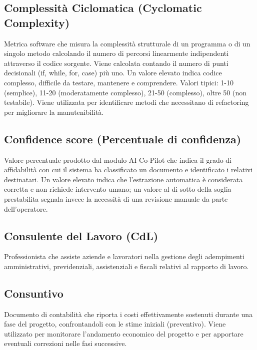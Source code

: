 \documentclass[a4paper,11pt]{article}
\begin{document}
\subsection{Complessità Ciclomatica (Cyclomatic Complexity)}
Metrica software che misura la complessità strutturale di un programma o di un singolo metodo calcolando il numero di percorsi linearmente indipendenti attraverso il codice sorgente. Viene calcolata contando il numero di punti decisionali (if, while, for, case) più uno. Un valore elevato indica codice complesso, difficile da testare, mantenere e comprendere. Valori tipici: 1-10 (semplice), 11-20 (moderatamente complesso), 21-50 (complesso), oltre 50 (non testabile). Viene utilizzata per identificare metodi che necessitano di refactoring per migliorare la manutenibilità.






\subsection{Confidence score (Percentuale di confidenza)}
Valore percentuale prodotto dal modulo AI Co-Pilot che indica il grado di affidabilità con cui il sistema ha classificato un documento e identificato i relativi destinatari. Un valore elevato indica che l'estrazione automatica è considerata corretta e non richiede intervento umano; un valore al di sotto della soglia prestabilita segnala invece la necessità di una revisione manuale da parte dell'operatore. 




\subsection{Consulente del Lavoro (CdL)}
Professionista che assiste aziende e lavoratori nella gestione degli adempimenti amministrativi, previdenziali, assistenziali e fiscali relativi al rapporto di lavoro.









\subsection{Consuntivo}
Documento di contabilità che riporta i costi effettivamente sostenuti durante una fase del progetto, confrontandoli con le stime iniziali (preventivo). Viene utilizzato per monitorare l'andamento economico del progetto e per apportare eventuali correzioni nelle fasi successive.
\end{document}
